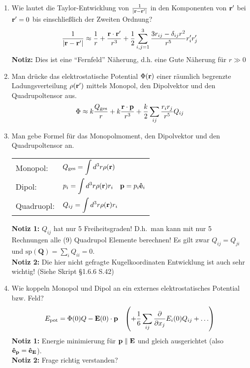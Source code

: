 \documentclass{scrartcl}
\newcommand{\rr}[1]{\frac{#1}{\abs{\vb{r}-\vb{r}'}}}
\newcommand{\ds}{\displaystyle}
\begin{document}
  \begin{enumerate}

    \item Wie lautet die Taylor-Entwicklung von $\rr{1}$ in den Komponenten
          von $\vb r'$ bei $\vb r'=0$ bis einschließlich der Zweiten
          Ordnung?
          $$ 
          \rr{1}\approx \frac{1}{r}+\frac{\vb r\cdot\vb r'}{r^3} +
          \frac{1}{2}\sum_{i,j=1}^3\frac{3r_{ij}-\delta_{ij}r^2}{r^5}
          r_i'r_j'
          $$
          \textbf{Notiz:} Dies ist eine ``Fernfeld'' Näherung, d.h. 
          eine Gute Näherung für $r\gg 0$

    \item Man drücke das elektrostatische Potential $\Phi(\vb r)$ einer
          räumlich begrenzte Ladungsverteilung $\rho(\vb r')$ mittels
          Monopol, den Dipolvektor und den Quadrupoltensor aus.
          $$
          \Phi\approx k\frac{Q_\text{ges}}{r} +
          k\frac{\vb r\cdot \vb p}{r^3} +
          \frac{k}{2} \sum_{ij}\frac{r_ir_j}{r^5}Q_{ij}
          $$

    \item Man gebe Formel für das Monopolmoment, den Dipolvektor und den
          Quadrupoltensor an.
          \begin{center}
          \begin{tabular}{ll}
            Monopol:    & $\ds Q_{\text{ges}}=\int d^3r\rho(\vb r)$\\
            Dipol:      & $\ds p_i=\int d^3r\rho(\vb r)r_i
                               \quad\vb p=p_i\vu{e}_i$\\
            Quadruopl:  & $\ds Q_{ij}=\int d^3r\rho(\vb r)r_i$\\
          \end{tabular}
          \end{center}
          \textbf{Notiz 1:} $Q_{ij}$ hat nur 5 Freiheitsgraden! D.h.\ man kann           mit nur 5 Rechnungen alle (9) Quadrupol Elemente berechnen! Es
          gilt zwar $Q_{ij}=Q_{ji}$ und 
          $\text{sp}(\bm Q)=\sum_i Q_{ii}=0$.\\
          \textbf{Notiz 2:} Die hier nicht gefragte Kugelkoordinaten
          Entwicklung ist auch sehr wichtig! (Siehe Skript §1.6.6 S.42)

    \item Wie koppeln Monopol und Dipol an ein externes elektrostatisches
          Potential bzw. Feld?
          $$E_{\text{pot}}=\Phi(0)Q-\vb E(0)\cdot\vb p 
          \quad\qty(+ \frac{1}{6}\sum_{ij}\pdv{x_j}E_i(0)Q_{ij}+\ldots)$$
          \textbf{Notiz 1:} Energie minimierung für $\vb p\parallel \vb E$
          und gleich ausgerichtet (also $\vu e_{\vb p}=\vu e_{\vb E}$).\\
          \textbf{Notiz 2:} Frage richtig verstanden?


\end{enumerate}
\end{document}
